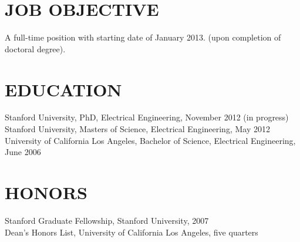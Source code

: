 \documentclass{res}
\begin{document}
 

\address{\texttt{jesselu@stanford.edu} \\ 66 Newell Rd. Apt. O \\ East Palo Alto, CA \\ (408) 568-9356}
                                  
\begin{resume}

\section{JOB OBJECTIVE}          
    A full-time position with starting date of January 2013.
    (upon completion of doctoral degree).

\section{EDUCATION}          
    Stanford University, PhD, Electrical Engineering, November 2012 (in progress) \\
    Stanford University, Masters of Science, Electrical Engineering, May 2012 \\
    University of California Los Angeles, Bachelor of Science, Electrical Engineering, June 2006

\section{HONORS}
    Stanford Graduate Fellowship, Stanford University, 2007 \\
    Dean's Honors List, University of California Los Angeles, five quarters
 

\end{resume}
\end{document}
